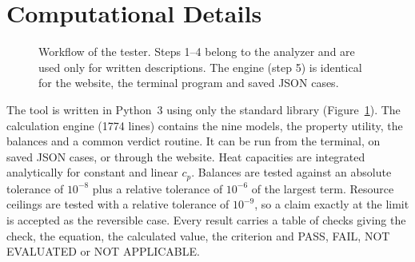 \documentclass[journal=iecred,manuscript=article,layout=twocolumn,email=false]{achemso}
\begin{document}
\section{Computational Details}
\begin{figure}
\centering
{}
\caption{Workflow of the tester. Steps 1--4 belong to the analyzer and are used only for written descriptions. The
engine (step 5) is identical for the website, the terminal program and saved JSON cases.}
\label{fig:workflow}
\end{figure}

The tool is written in Python~3 using only the standard library (Figure~\ref{fig:workflow}). The calculation engine
(\num{1774} lines) contains the nine models, the property utility, the balances and a common verdict routine. It
can be run from the terminal, on saved JSON cases, or through the website. Heat capacities are integrated analytically
for constant and linear $c_p$. Balances are tested against an absolute tolerance of $10^{-8}$ plus a relative
tolerance of $10^{-6}$ of the largest term. Resource ceilings are tested with a relative tolerance of $10^{-9}$, so a
claim exactly at the limit is accepted as the reversible case. Every result carries a table of checks giving the
check, the equation, the calculated value, the criterion and PASS, FAIL, NOT EVALUATED or NOT APPLICABLE.
\end{document}
